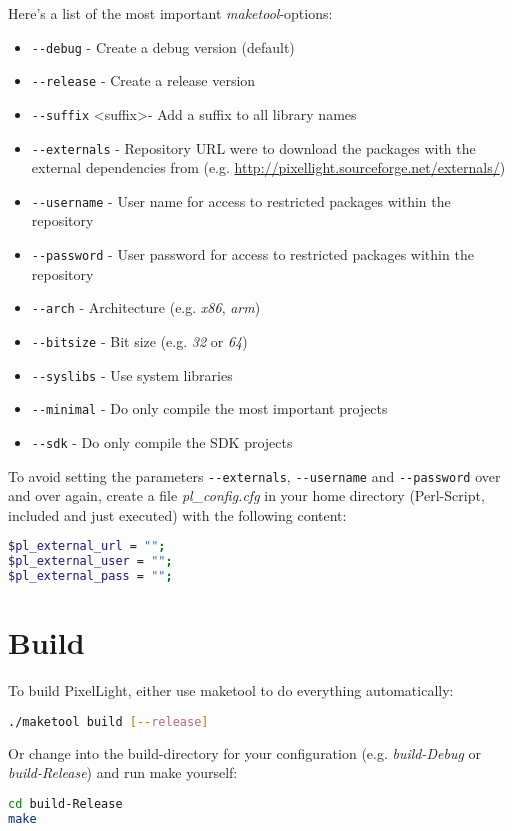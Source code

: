 Here's a list of the most important \emph{maketool}-options:
\begin{itemize}
\item{\verb+--debug+								- Create a debug version (default)}
\item{\verb+--release+								- Create a release version}
\item{\verb+--suffix+ \textless suffix\textgreater	- Add a suffix to all library names}
\item{\verb+--externals+							- Repository \ac{URL} were to download the packages with the external dependencies from (e.g. \url{http://pixellight.sourceforge.net/externals/})}
\item{\verb+--username+								- User name for access to restricted packages within the repository}
\item{\verb+--password+								- User password for access to restricted packages within the repository}
\item{\verb+--arch+									- Architecture (e.g. \emph{x86}, \emph{arm})}
\item{\verb+--bitsize+								- Bit size (e.g. \emph{32} or \emph{64})}
\item{\verb+--syslibs+								- Use system libraries}
\item{\verb+--minimal+								- Do only compile the most important projects}
\item{\verb+--sdk+									- Do only compile the SDK projects}
\end{itemize}

To avoid setting the parameters \verb+--externals+, \verb+--username+ and \verb+--password+ over and over again, create a file \emph{pl\_config.cfg} in your home directory (Perl-Script, included and just executed) with the following content:
\begin{lstlisting}[language=sh]
$pl_external_url = "";
$pl_external_user = "";
$pl_external_pass = "";
\end{lstlisting}




\section{Build}
\label{Chapter:Linux_Build}
To build PixelLight, either use maketool to do everything automatically:
\begin{lstlisting}[language=sh]
./maketool build [--release]
\end{lstlisting}

Or change into the build-directory for your configuration (e.g. \emph{build-Debug} or \emph{build-Release}) and run make yourself:
\begin{lstlisting}[language=sh]
cd build-Release
make
\end{lstlisting}

